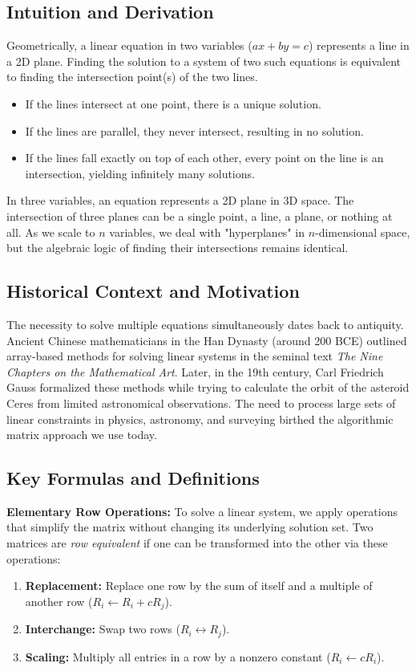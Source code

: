 \documentclass[11pt]{article}
\begin{document}
\subsection{Intuition and Derivation}
Geometrically, a linear equation in two variables ($ax + by = c$) represents a line in a 2D plane. Finding the solution to a system of two such equations is equivalent to finding the intersection point(s) of the two lines. 
\begin{itemize}
    \item If the lines intersect at one point, there is a unique solution.
    \item If the lines are parallel, they never intersect, resulting in no solution.
    \item If the lines fall exactly on top of each other, every point on the line is an intersection, yielding infinitely many solutions.
\end{itemize}
In three variables, an equation represents a 2D plane in 3D space. The intersection of three planes can be a single point, a line, a plane, or nothing at all. As we scale to $n$ variables, we deal with "hyperplanes" in $n$-dimensional space, but the algebraic logic of finding their intersections remains identical.

\subsection{Historical Context and Motivation}
The necessity to solve multiple equations simultaneously dates back to antiquity. Ancient Chinese mathematicians in the Han Dynasty (around 200 BCE) outlined array-based methods for solving linear systems in the seminal text \textit{The Nine Chapters on the Mathematical Art}. Later, in the 19th century, Carl Friedrich Gauss formalized these methods while trying to calculate the orbit of the asteroid Ceres from limited astronomical observations. The need to process large sets of linear constraints in physics, astronomy, and surveying birthed the algorithmic matrix approach we use today.

\subsection{Key Formulas and Definitions}
\textbf{Elementary Row Operations:} To solve a linear system, we apply operations that simplify the matrix without changing its underlying solution set. Two matrices are \textit{row equivalent} if one can be transformed into the other via these operations:
\begin{enumerate}
    \item \textbf{Replacement:} Replace one row by the sum of itself and a multiple of another row ($R_i \leftarrow R_i + cR_j$).
    \item \textbf{Interchange:} Swap two rows ($R_i \leftrightarrow R_j$).
    \item \textbf{Scaling:} Multiply all entries in a row by a nonzero constant ($R_i \leftarrow cR_i$).
\end{enumerate}
\end{document}
